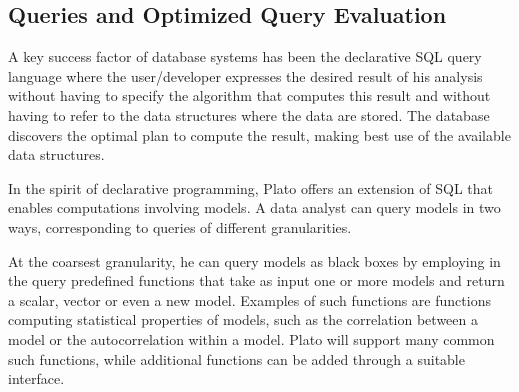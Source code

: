 

\subsection{Queries and Optimized Query Evaluation}
\label{sec:queries}
A key success factor of database systems has been the declarative SQL query language where the user/developer expresses the desired result of his analysis without having to specify the algorithm that computes this result and without having to refer to the data structures where the data are stored. The database discovers the optimal plan to compute the result, making best use of the available data structures. 

In the spirit of declarative programming, Plato offers an extension of SQL that enables computations involving models. A data analyst can query models in two ways, corresponding to queries of different granularities.

At the coarsest granularity, he can query models as black boxes by employing in the query predefined functions that take as input one or more models and return a scalar, vector or even a new model. Examples of such functions are functions computing statistical properties of models, such as the correlation between a model or the autocorrelation within a model. Plato will support many common such functions, while additional functions can be added through a suitable interface.

